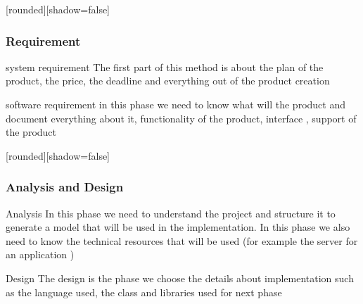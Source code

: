 \documentclass[10pt]{beamer}
\begin{document}
\begin{frame}[plain]
[rounded][shadow=false]
\frametitle{Requirement}

\begin{block}{system requirement}
The first part of this method is about the plan of the product, the price, the deadline and everything out of the product creation
\end{block}

\begin{block}{software requirement}
in this phase we need to know what will the product and document everything about it, functionality of the product, interface , support of the product  
\end{block}
\end{frame}
\begin{frame}[plain]
[rounded][shadow=false]
\frametitle{Analysis and Design}

\begin{block}{Analysis}
In this phase we need to understand the project and structure it to generate a model that will be used in the implementation. In this phase we also need to know the technical resources that will be used (for example the server for an application )
\end{block}
\begin{block}{Design}
The design is the phase we choose the details about implementation such as the language used, the class and libraries used for next phase

\end{block}

\end{frame}
\end{document}
